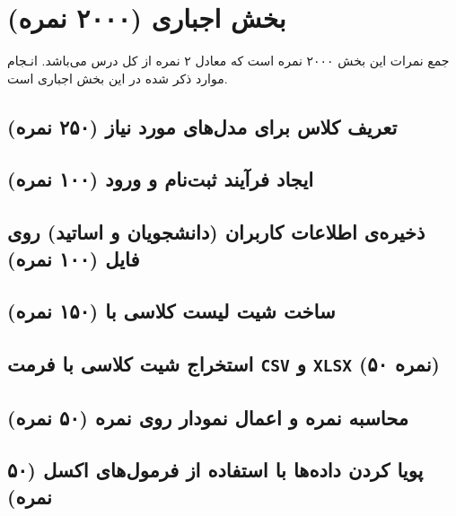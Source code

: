\documentclass[a4paper]{report}
\begin{document}


\newpage
\tableofcontents

\newpage



\chapter{بخش اجباری (۲۰۰۰ نمره)}
\begin{center}
    \begin{warningbox}
        \Large
        جمع نمرات این بخش ۲۰۰۰ نمره است که معادل ۲ نمره از کل درس می‌باشد.
        انـجام موارد ذکر شده در این بخش اجباری است.
    \end{warningbox}
\end{center}

\section{تعریف کلاس برای مدل‌های مورد نیاز (۲۵۰ نمره)}

\section{ایجاد فرآیند ثبت‌نام و ورود (۱۰۰ نمره)}

\section{ذخیره‌ی اطلاعات کاربران (دانشجویان و اساتید) روی فایل (۱۰۰ نمره)}

\section{ساخت شیت لیست کلاسی با  (۱۵۰ نمره)}

\section{استخراج شیت کلاسی با فرمت \texttt{CSV} و \texttt{XLSX} (۵۰ نمره)}

\section{محاسبه نمره و اعمال نمودار روی نمره (۵۰ نمره)}

\section{پویا کردن داده‌ها با استفاده از فرمول‌های اکسل (۵۰ نمره)}
\end{document}
